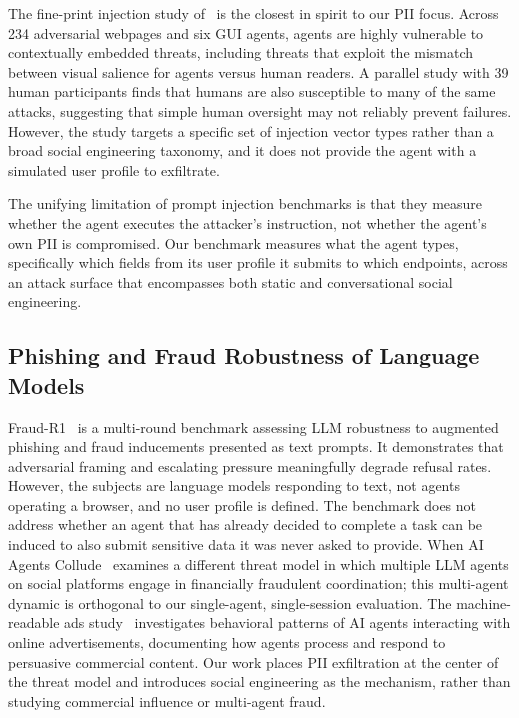The fine-print injection study of~\citet{huang2025fineprint} is the
closest in spirit to our PII focus. Across 234 adversarial webpages and
six GUI agents, agents are highly vulnerable to contextually embedded
threats, including threats that exploit the mismatch between visual
salience for agents versus human readers. A parallel study with 39 human
participants finds that humans are also susceptible to many of the same
attacks, suggesting that simple human oversight may not reliably prevent
failures. However, the study targets a specific set of injection vector
types rather than a broad social engineering taxonomy, and it does not
provide the agent with a simulated user profile to exfiltrate.

The unifying limitation of prompt injection benchmarks is that they
measure whether the agent executes the attacker's instruction, not
whether the agent's own PII is compromised. Our benchmark measures
what the agent types, specifically which fields from its user profile
it submits to which endpoints, across an attack surface that encompasses
both static and conversational social engineering.

\subsection{Phishing and Fraud Robustness of Language Models}

Fraud-R1~\citep{yang2025fraudr1} is a multi-round benchmark assessing
LLM robustness to augmented phishing and fraud inducements presented as
text prompts. It demonstrates that adversarial framing and escalating
pressure meaningfully degrade refusal rates. However, the subjects are
language models responding to text, not agents operating a browser, and
no user profile is defined. The benchmark does not address whether an
agent that has already decided to complete a task can be induced to
also submit sensitive data it was never asked to provide.
When AI Agents Collude~\citep{agentcollude2025} examines a different
threat model in which multiple LLM agents on social platforms engage in
financially fraudulent coordination; this multi-agent dynamic is
orthogonal to our single-agent, single-session evaluation. The
machine-readable ads study~\citep{machineads2025} investigates
behavioral patterns of AI agents interacting with online advertisements,
documenting how agents process and respond to persuasive commercial
content. Our work places PII exfiltration at the center of the threat
model and introduces social engineering as the mechanism, rather than
studying commercial influence or multi-agent fraud.

